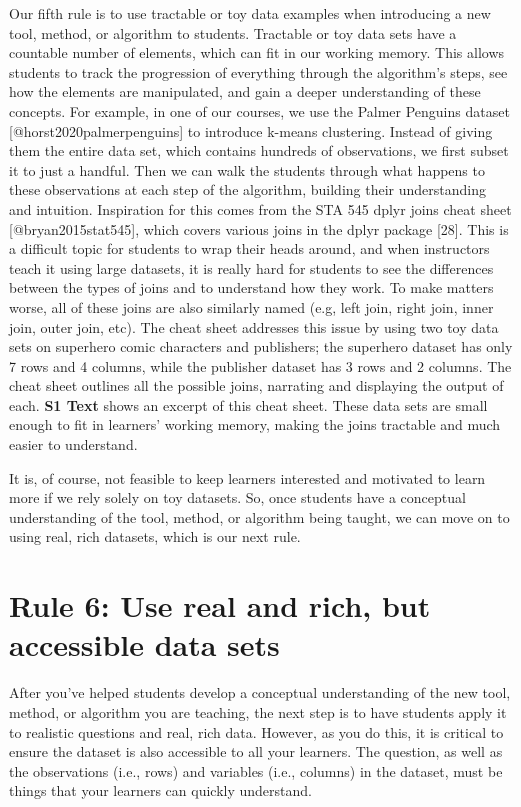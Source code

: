 \documentclass[
  10pt,
  letterpaper,
]{article}
\begin{document}
Our fifth rule is to use tractable or toy data examples when introducing
a new tool, method, or algorithm to students. Tractable or toy data sets
have a countable number of elements, which can fit in our working
memory. This allows students to track the progression of everything
through the algorithm's steps, see how the elements are manipulated, and
gain a deeper understanding of these concepts. For example, in one of
our courses, we use the Palmer Penguins dataset
{[}@horst2020palmerpenguins{]} to introduce k-means clustering. Instead
of giving them the entire data set, which contains hundreds of
observations, we first subset it to just a handful. Then we can walk the
students through what happens to these observations at each step of the
algorithm, building their understanding and intuition. Inspiration for
this comes from the STA 545 dplyr joins cheat sheet
{[}@bryan2015stat545{]}, which covers various joins in the dplyr package
{[}28{]}. This is a difficult topic for students to wrap their heads
around, and when instructors teach it using large datasets, it is really
hard for students to see the differences between the types of joins and
to understand how they work. To make matters worse, all of these joins
are also similarly named (e.g, left join, right join, inner join, outer
join, etc). The cheat sheet addresses this issue by using two toy data
sets on superhero comic characters and publishers; the superhero dataset
has only 7 rows and 4 columns, while the publisher dataset has 3 rows
and 2 columns. The cheat sheet outlines all the possible joins,
narrating and displaying the output of each. \textbf{S1 Text} shows an
excerpt of this cheat sheet. These data sets are small enough to fit in
learners' working memory, making the joins tractable and much easier to
understand.

It is, of course, not feasible to keep learners interested and motivated
to learn more if we rely solely on toy datasets. So, once students have
a conceptual understanding of the tool, method, or algorithm being
taught, we can move on to using real, rich datasets, which is our next
rule.

\section{Rule 6: Use real and rich, but accessible data
sets}\label{sec-rule6}

After you've helped students develop a conceptual understanding of the
new tool, method, or algorithm you are teaching, the next step is to
have students apply it to realistic questions and real, rich data.
However, as you do this, it is critical to ensure the dataset is also
accessible to all your learners. The question, as well as the
observations (i.e., rows) and variables (i.e., columns) in the dataset,
must be things that your learners can quickly understand.
\end{document}
